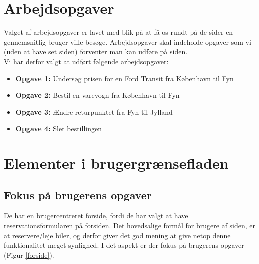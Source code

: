 \documentclass[a4paper]{article}
\begin{document}
\section{Arbejdsopgaver}

Valget af arbejdsopgaver er lavet med blik på at få os rundt på de sider en
gennemsnitlig bruger ville besøge. Arbejdsopgaver skal indeholde opgaver som vi 
(uden at have set siden) forventer man kan udføre på siden.\\
Vi har derfor valgt at udført følgende arbejdsopgaver:

\begin{itemize}
\item{\textbf{Opgave 1:}}
    Undersøg prisen for en Ford Transit fra København til Fyn
\item{\textbf{Opgave 2:}}
    Bestil en varevogn fra København til Fyn
\item{\textbf{Opgave 3:}}
    Ændre returpunktet fra Fyn til Jylland
\item{\textbf{Opgave 4:}}
    Slet bestillingen
\end{itemize}

\section{Elementer i brugergrænsefladen}
\subsection{Fokus på brugerens opgaver}
De har en brugercentreret forside, fordi de har valgt at have
reservationsformularen på forsiden. Det hovedsalige formål for brugere af siden,
er at reservere/leje biler, og derfor giver det god mening at give netop denne
funktionalitet meget synlighed. I det aspekt er der fokus på brugerens opgaver
(Figur \ref{forside}).
\end{document}
